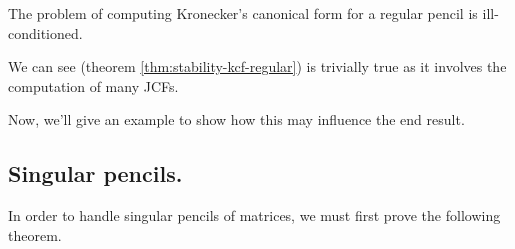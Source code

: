 \begin{theorem} \label{thm:stability-kcf-regular}
    The problem of computing Kronecker's canonical form for a regular pencil
    is ill-conditioned.
\end{theorem} 

We can see  (theorem \ref{thm:stability-kcf-regular}) is
trivially true as it involves the computation of many JCFs.

Now, we'll give an example to show how this may influence the end result.

\begin{example}
    
\end{example}

\subsection*{Singular pencils.}
In order to handle singular pencils of matrices, we must first prove the following theorem.

